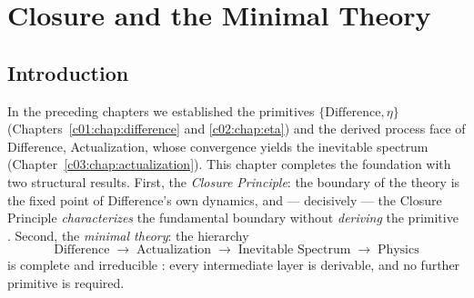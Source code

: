 %
%


\chapter{Closure and the Minimal Theory}
\label{c04:chap:closure-minimal}

\section{Introduction}
\label{c04:sec:closure-introduction}

In the preceding chapters we established the primitives $\{\text{Difference},\eta\}$
(Chapters~\ref{c01:chap:difference} and \ref{c02:chap:eta}) and the derived process face of
Difference, Actualization, whose convergence yields the inevitable spectrum
(Chapter~\ref{c03:chap:actualization}). This chapter completes the foundation with two
structural results. First, the \emph{Closure Principle}: the boundary of the theory is the
fixed point of Difference's own dynamics, and --- decisively --- the Closure Principle
\emph{characterizes} the fundamental boundary without \emph{deriving} the primitive
\cite{c04:QG278,c04:QG282}. Second, the \emph{minimal theory}: the hierarchy
\begin{equation}
\label{c04:eq:minimal}
\text{Difference}\;\longrightarrow\;\text{Actualization}\;\longrightarrow\;\text{Inevitable Spectrum}\;\longrightarrow\;\text{Physics}
\end{equation}
is complete and irreducible \cite{c04:QG293,c04:QG294}: every intermediate layer is derivable, and
no further primitive is required.

